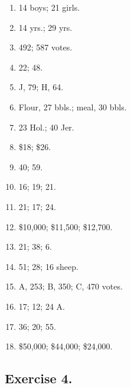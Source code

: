 \documentclass{book}
\begin{document}
\begin{enumerate}

\item 14 boys; 21 girls.

\item 14 yrs.; 29 yrs.

\item 492; 587 votes.

\item 22; 48.

\item J, 79; H, 64.

\item Flour, 27 bbls.; meal, 30 bbls.

\item 23 Hol.; 40 Jer.

\item \$18; \$26.

\item 40; 59.

\item 16; 19; 21.

\item 21; 17; 24.

\item \$10,000; \$11,500; \$12,700.

\item 21; 38; 6.

\item 51; 28; 16 sheep.

\item A, 253; B, 350; C, 470 votes.

\item 17; 12; 24 A.

\item 36; 20; 55.

\item \$50,000; \$44,000; \$24,000.

\end{enumerate}

\subsection*{Exercise 4.}
\end{document}
